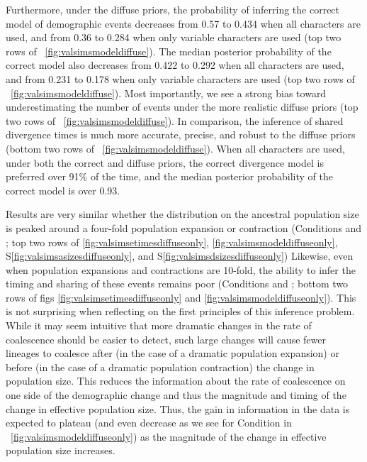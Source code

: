 \ifembed{

}{}

Furthermore, under the diffuse priors, the probability of inferring the correct
model of demographic events decreases from 0.57 to 0.434 when all characters
are used, and from 0.36 to 0.284 when only variable characters are used
(top two rows of \fig{}~\ref{fig:valsimsmodeldiffuse}).
The median posterior probability of the correct model also decreases from
0.422 to 0.292 when all characters are used,
and from 0.231 to 0.178 when only variable characters are used
(top two rows of \fig{}~\ref{fig:valsimsmodeldiffuse}).
Most importantly, we see a strong bias toward underestimating the number of
events under the more realistic diffuse priors
(top two rows of \fig{}~\ref{fig:valsimsmodeldiffuse}).
In comparison, the inference of shared divergence times is much more accurate,
precise, and robust to the diffuse priors
(bottom two rows of \fig{}~\ref{fig:valsimsmodeldiffuse}).
When all characters are used, under both the correct and diffuse
priors, the correct divergence model is preferred over 91\% of the time,
and the median posterior probability of the correct model is over
0.93.

\ifembed{

}{}

Results are very similar whether the distribution on the
ancestral population size is peaked around a four-fold population
expansion or contraction
(Conditions \msimfourinc and \msimfourdec;
top two rows of \figs
\ref{fig:valsimsetimesdiffuseonly},
\ref{fig:valsimsmodeldiffuseonly},
S\ref{fig:valsimsasizesdiffuseonly},
and
S\ref{fig:valsimsdsizesdiffuseonly})
Likewise, even when population expansions
and contractions are 10-fold, the ability to infer
the timing and sharing of these events remains
poor
(Conditions \msimteninc and \msimtendec;
bottom two rows of figs
\ref{fig:valsimsetimesdiffuseonly} and 
\ref{fig:valsimsmodeldiffuseonly}).
This is not surprising when reflecting on the first principles of this
inference problem.
While it may seem intuitive that more dramatic changes in the rate
of coalescence should be easier to detect, such large changes
will cause fewer lineages to coalesce
after (in the case of a dramatic population expansion)
or
before (in the case of a dramatic population contraction)
the change in population size.
This reduces the information about the rate of coalescence on one side of the
demographic change and thus the magnitude and timing of the change in effective
population size.
Thus, the gain in information in the data is expected to plateau (and even
decrease as we see for Condition \msimtendec in
\fig{}~\ref{fig:valsimsmodeldiffuseonly})
as the magnitude of the change in effective population size increases.

